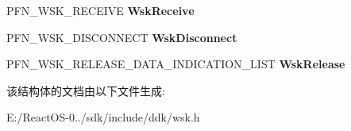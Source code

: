 \begin{DoxyCompactItemize}
P\+F\+N\+\_\+\+W\+S\+K\+\_\+\+R\+E\+C\+E\+I\+VE {\bfseries Wsk\+Receive}
\item 
\mbox{\label{struct___w_s_k___p_r_o_v_i_d_e_r___c_o_n_n_e_c_t_i_o_n___d_i_s_p_a_t_c_h_a1f5bb2c7df0cd8347e3897fa7b3e7153}} 
P\+F\+N\+\_\+\+W\+S\+K\+\_\+\+D\+I\+S\+C\+O\+N\+N\+E\+CT {\bfseries Wsk\+Disconnect}
\item 
\mbox{\label{struct___w_s_k___p_r_o_v_i_d_e_r___c_o_n_n_e_c_t_i_o_n___d_i_s_p_a_t_c_h_ac827c075fbd251cee2fdf8a3c928acb6}} 
P\+F\+N\+\_\+\+W\+S\+K\+\_\+\+R\+E\+L\+E\+A\+S\+E\+\_\+\+D\+A\+T\+A\+\_\+\+I\+N\+D\+I\+C\+A\+T\+I\+O\+N\+\_\+\+L\+I\+ST {\bfseries Wsk\+Release}
\end{DoxyCompactItemize}


该结构体的文档由以下文件生成\+:\begin{DoxyCompactItemize}
\item 
E\+:/\+React\+O\+S-\/0../sdk/include/ddk/wsk.\+h\end{DoxyCompactItemize}
